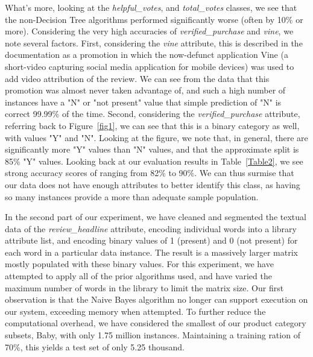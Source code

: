 \documentclass[10pt, conference, compsocconf]{IEEEtran}
\begin{document}
What's more, looking at the \textit{helpful\_votes}, and \textit{total\_votes} classes, we see that the non-Decision Tree algorithms performed significantly worse (often by 10\% or more). Considering the very high accuracies of \textit{verified\_purchase} and \textit{vine}, we note several factors. First, considering the \textit{vine} attribute, this is described in the documentation as a promotion in which the now-defunct application Vine (a short-video capturing social media application for mobile devices) was used to add video attribution of the review. We can see from the data that this promotion was almost never taken advantage of, and such a high number of instances have a "N" or "not present" value that simple prediction of "N" is correct 99.99\% of the time. Second, considering the \textit{verified\_purchase} attribute, referring back to Figure~\ref{fig1}, we can see that this is a binary category as well, with values "Y" and "N". Looking at the figure, we note that, in general, there are significantly more "Y" values than "N" values, and that the approximate split is 85\% "Y" values. Looking back at our evaluation results in Table~\ref{Table2}, we see strong accuracy scores of ranging from 82\% to 90\%. We can thus surmise that our data does not have enough attributes to better identify this class, as having so many instances provide a more than adequate sample population. 

In the second part of our experiment, we have cleaned and segmented the textual data of the \textit{review\_headline} attribute, encoding individual words into a library attribute list, and encoding binary values of 1 (present) and 0 (not present) for each word in a particular data instance. The result is a massively larger matrix mostly populated with these binary values. For this experiment, we have attempted to apply all of the prior algorithms used, and have varied the maximum number of words in the library to limit the matrix size. Our first observation is that the Naive Bayes algorithm no longer can support execution on our system, exceeding memory when attempted. To further reduce the computational overhead, we have considered the smallest of our product category subsets, Baby, with only 1.75 million instances. Maintaining a training ration of 70\%, this yields a test set of only 5.25 thousand. 
\end{document}
